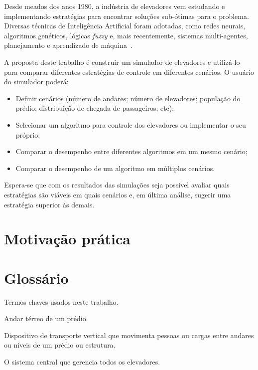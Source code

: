 Desde meados dos anos 1980, a indústria de elevadores vem estudando e implementando estratégias para encontrar soluções sub-ótimas para o problema. Diversas técnicas de Inteligência Artificial foram adotadas, como redes neurais, algoritmos genéticos, lógicas \textit{fuzzy} e, mais recentemente, sistemas multi-agentes, planejamento e aprendizado de máquina~\cite{KOEHLEROTTIGER02}.

A proposta deste trabalho é construir um simulador de elevadores e utilizá-lo para comparar diferentes estratégias de controle em diferentes cenários. O usuário do simulador poderá:

\begin{itemize}
  \item Definir cenários (número de andares; número de elevadores; população do prédio; distribuição de chegada de passageiros; etc);
  \item Selecionar um algoritmo para controle dos elevadores ou implementar o seu próprio;
  \item Comparar o desempenho entre diferentes algoritmos em um mesmo cenário;
  \item Comparar o desempenho de um algoritmo em múltiplos cenários.
\end{itemize}

Espera-se que com os resultados das simulações seja possível avaliar quais estratégias são viáveis em quais cenários e, em última análise, sugerir uma estratégia superior às demais.

\section{Motivação prática}

\section{Glossário}

Termos chaves usados neste trabalho.

\begin{description}[leftmargin=!,labelwidth=\widthof{\bfseries Sistema de Controle}]
  \item[Lobby]                Andar térreo de um prédio.
  \item[Elevador]             Dispositivo de transporte vertical que movimenta pessoas ou cargas entre andares ou níveis de um prédio ou estrutura.
  \item[Sistema de Controle]  O sistema central que gerencia todos os elevadores.
\end{description}